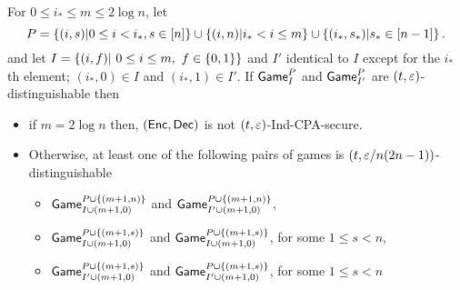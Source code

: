 \documentclass{article}
\def\A{{\sf A}}
\newcommand{\game}{{\sf Game}}
\newcommand{\dgg}[2]{\game_{#1}^{#2}}
\begin{document}

\begin{lemma}\label{lem:multiple}
For $0\leq i_*\leq m \leq 2\log n$, let  $$ P=\left\{ (i,s)| 0\leq i < i_*, s\in [n] \right\}\cup \left\{ (i,n)| i_*< i \leq m \right\} \cup \left\{ (i_*,s_*)| s_*\in[n-1] \right\}.$$ and let $ I=\left\{ (i,f)| \ 0\leq i \leq m,\ f\in\{0,1\} \right\}$ and $ I'$ identical to $ I$ except for the $i_*$th element; $(i_*,0)\in  I$ and $(i_*,1) \in I'$. If $\dgg{ I}{ P}$ and $\dgg{I'}{ P}$ are $(t,\varepsilon)$-distinguishable then

\begin{itemize}
\item if $m=2\log n$ then, $({\sf Enc},{\sf Dec})$ is not $(t, \varepsilon)$-Ind-CPA-secure.
\item Otherwise, 
 at least one of the following pairs of games is $(t,\varepsilon/n(2n-1))$-distinguishable

\begin{itemize}
\item $\dgg{ I\cup (m+1,0)}{ P\cup \cub{(m+1, n)}}$ and $\dgg{I'\cup (m+1,0)}{ P\cup \cub{(m+1, n)}}$,
\item $\dgg{ I\cup (m+1,0)}{ P\cup \cub{(m+1, s)}}$ and $\dgg{ I\cup (m+1,0)}{ P\cup \cub{(m+1, s)}}$, for some  $1\leq s< n$,
\item $\dgg{I'\cup (m+1,0)}{ P\cup \cub{(m+1, s)}}$ and $\dgg{I'\cup (m+1,0)}{ P\cup \cub{(m+1, s)}}$, for some  $1\leq s < n$
\end{itemize}
 \end{itemize}
\end{lemma}
\end{document}

